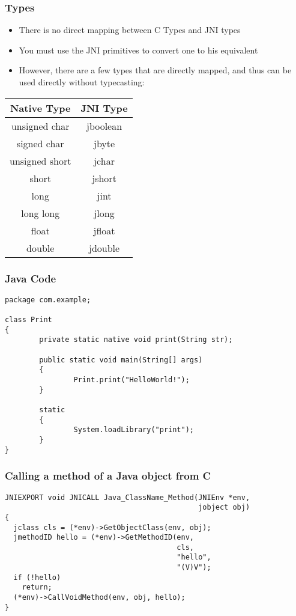 \begin{frame}
  \frametitle{Types}
  \begin{itemize}
  \item There is no direct mapping between C Types and JNI types
  \item You must use the JNI primitives to convert one to his equivalent
  \item However, there are a few types that are directly mapped, and
    thus can be used directly without typecasting:
  \end{itemize}
  \begin{center}
    \begin{tabular}{|c|c|}
      \hline
      Native Type & JNI Type\\
      \hline
      unsigned char & jboolean\\
      \hline
      signed char & jbyte\\
      \hline
      unsigned short & jchar\\
      \hline
      short & jshort\\
      \hline
      long & jint\\
      \hline
      long long & jlong\\
      \hline
      float & jfloat\\
      \hline
      double & jdouble\\
      \hline
    \end{tabular}
  \end{center}
\end{frame}

\begin{frame}[fragile]
  \frametitle{Java Code}
\begin{verbatim}
package com.example;

class Print
{
        private static native void print(String str);

        public static void main(String[] args)
        {
                Print.print("HelloWorld!");
        }

        static
        {
                System.loadLibrary("print");
        }
}
\end{verbatim}
\end{frame}

\begin{frame}[fragile]
  \frametitle{Calling a method of a Java object from C}
\begin{verbatim}
JNIEXPORT void JNICALL Java_ClassName_Method(JNIEnv *env,
                                             jobject obj)
{
  jclass cls = (*env)->GetObjectClass(env, obj);
  jmethodID hello = (*env)->GetMethodID(env,
                                        cls,
                                        "hello",
                                        "(V)V");
  if (!hello)
    return;
  (*env)->CallVoidMethod(env, obj, hello);
}
\end{verbatim}
\end{frame}

